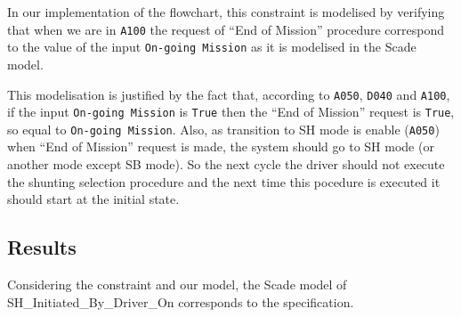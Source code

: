 In our implementation of the flowchart, this constraint is modelised
by verifying that when we are in \texttt{A100} the request of ``End of
Mission'' procedure correspond to the value of the input
\texttt{On-going Mission} as it is modelised in the Scade model.

This modelisation is justified by the fact that, according to
\texttt{A050}, \texttt{D040} and \texttt{A100}, if the input
\texttt{On-going Mission} is \texttt{True} then the ``End of Mission''
request is \texttt{True}, so equal to \texttt{On-going Mission}. Also,
as transition to SH mode is enable (\texttt{A050}) when ``End of
Mission'' request is made, the system should go to SH mode (or another
mode except SB mode). So the next cycle the driver should not execute
the shunting selection procedure and the next time this pocedure is
executed it should start at the initial state.


\subsection{Results}
Considering the constraint and our model, the Scade model of
SH\_Initiated\_By\_Driver\_On corresponds to the specification.


